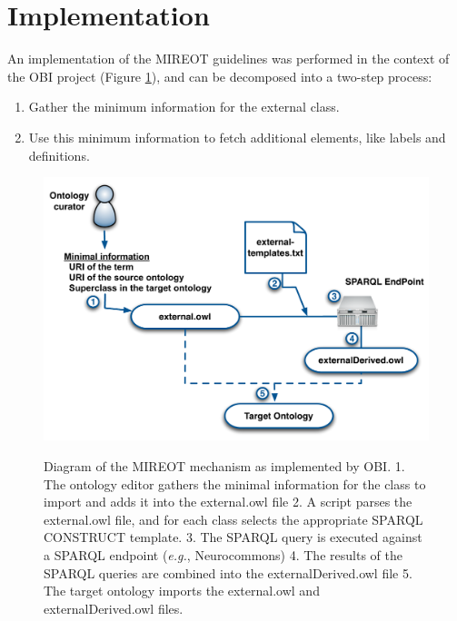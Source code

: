 \documentclass[jou]{ao2e}%
\begin{document}
\section{Implementation}

An implementation of the \ac{MIREOT} guidelines was performed in the context of the \ac{OBI} project (Figure \ref{fig:mechanism2}), and can be decomposed into a two-step process:

\begin{enumerate}
\item Gather the minimum information for the external class.
\item Use this minimum information to fetch additional elements, like labels and definitions.
\end{enumerate}

\begin{figure}[t]
\centering
{
\includegraphics[width=.9\linewidth]{./figs/mechanism2.pdf}
}
\caption{Diagram of the MIREOT mechanism as implemented by OBI.
1. The ontology editor gathers the minimal information for the class to import and adds it into the external.owl file
2. A script parses the external.owl file, and for each class selects the appropriate SPARQL CONSTRUCT template.
3. The SPARQL query is executed against a SPARQL endpoint (\emph{e.g.}, Neurocommons)
4. The results of the SPARQL queries are combined into the externalDerived.owl file
5. The target ontology imports the external.owl and externalDerived.owl files.
}
\label{fig:mechanism2}
\end{figure}
\end{document}
